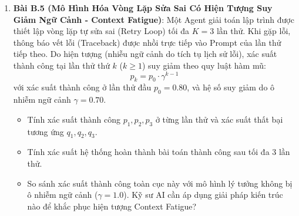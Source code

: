 \begin{enumerate}
  \item \textbf{Bài B.5 (Mô Hình Hóa Vòng Lặp Sửa Sai Có Hiện Tượng Suy Giảm Ngữ Cảnh - Context Fatigue)}:
  Một Agent giải toán lập trình được thiết lập vòng lặp tự sửa sai (Retry Loop) tối đa $K = 3$ lần thử. Khi gặp lỗi, thông báo vết lỗi (Traceback) được nhồi trực tiếp vào Prompt của lần thử tiếp theo.
  Do hiện tượng  (nhiễu ngữ cảnh do tích tụ lịch sử lỗi), xác suất thành công tại lần thử thứ $k$ ($k \ge 1$) suy giảm theo quy luật hàm mũ:
  \begin{equation*}
  p_k = p_0 \cdot \gamma^{k-1}
  \end{equation*}
  với xác suất thành công ở lần thử đầu $p_0 = 0.80$, và hệ số suy giảm do ô nhiễm ngữ cảnh $\gamma = 0.70$.
  \begin{itemize}
    \item[a)] Tính xác suất thành công $p_1, p_2, p_3$ ở từng lần thử và xác suất thất bại tương ứng $q_1, q_2, q_3$.
    \item[b)] Tính xác suất hệ thống hoàn thành bài toán thành công sau tối đa 3 lần thử.
    \item[c)] So sánh xác suất thành công toàn cục này với mô hình lý tưởng không bị ô nhiễm ngữ cảnh ($\gamma = 1.0$). Kỹ sư AI cần áp dụng giải pháp kiến trúc nào để khắc phục hiện tượng Context Fatigue?
  \end{itemize}
\end{enumerate}

